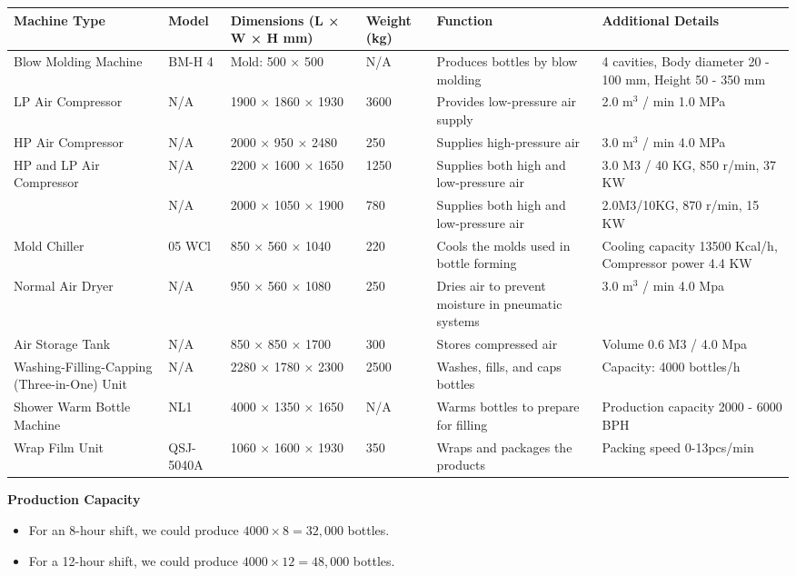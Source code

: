 \documentclass{article}
\begin{document}
\begin{tabular}{|p{2.5cm}|p{1.5cm}|p{3cm}|p{1.5cm}|p{3cm}|p{3cm}|}
\hline 
\textbf{Machine Type} & \textbf{Model} & \textbf{Dimensions (L × W × H mm)} & \textbf{Weight (kg)} & \textbf{Function} & \textbf{Additional Details} \\
\hline 
Blow Molding Machine & BM-H 4 & Mold: 500 × 500 & N/A & Produces bottles by blow molding & 4 cavities, Body diameter 20 - 100 mm, Height 50 - 350 mm \\
\hline 
LP Air Compressor & N/A & 1900 × 1860 × 1930 & 3600 & Provides low-pressure air supply & 2.0 m\(^3\) / min 1.0 MPa \\
\hline 
HP Air Compressor & N/A & 2000 × 950 × 2480 & 250 & Supplies high-pressure air & 3.0 m\(^3\) / min 4.0 MPa \\
\hline 
HP and LP Air Compressor & N/A & 2200 × 1600 × 1650 & 1250 & Supplies both high and low-pressure air & 3.0 M3 / 40 KG, 850 r/min, 37 KW \\
\hline 
& N/A & 2000 × 1050 × 1900 & 780 & Supplies both high and low-pressure air & 2.0M3/10KG, 870 r/min, 15 KW \\
\hline 
Mold Chiller & 05 WCl & 850 × 560 × 1040 & 220 & Cools the molds used in bottle forming & Cooling capacity 13500 Kcal/h, Compressor power 4.4 KW \\
\hline 
Normal Air Dryer & N/A & 950 × 560 × 1080 & 250 & Dries air to prevent moisture in pneumatic systems & 3.0 m\(^3\) / min 4.0 Mpa \\
\hline 
Air Storage Tank & N/A & 850 × 850 × 1700 & 300 & Stores compressed air & Volume 0.6 M3 / 4.0 Mpa \\
\hline 
Washing-Filling-Capping (Three-in-One) Unit & N/A & 2280 × 1780 × 2300 & 2500 & Washes, fills, and caps bottles & Capacity: 4000 bottles/h \\
\hline 
Shower Warm Bottle Machine & NL1 & 4000 × 1350 × 1650 & N/A & Warms bottles to prepare for filling & Production capacity 2000 - 6000 BPH \\
\hline 
Wrap Film Unit & QSJ-5040A & 1060 × 1600 × 1930 & 350 & Wraps and packages the products & Packing speed 0-13pcs/min \\
\hline
\end{tabular}


\textbf{Production Capacity}
\begin{itemize}
    \item For an 8-hour shift, we could produce \( 4000 \times 8 = 32,000 \) bottles.
    \item For a 12-hour shift, we could produce \( 4000 \times 12 = 48,000 \) bottles.
\end{itemize}
\end{document}
